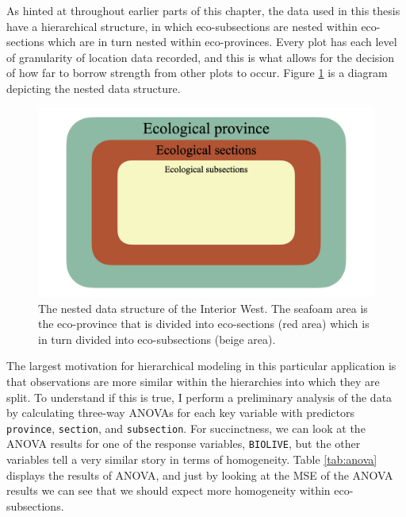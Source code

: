 \documentclass[12pt,twoside]{reedthesis}
\begin{document}
As hinted at throughout earlier parts of this chapter, the data used in this thesis have a hierarchical structure, in which eco-subsections are nested within eco-sections which are in turn nested within eco-provinces. Every plot has each level of granularity of location data recorded, and this is what allows for the decision of how far to borrow strength from other plots to occur. Figure \ref{fig:data-structure} is a diagram depicting the nested data structure.
\begin{figure}

{\centering \includegraphics[width=1\linewidth]{figure/data-structure-new} 

}

\caption[The nested data structure of the Interior West]{The nested data structure of the Interior West. The seafoam area is the eco-province that is divided into eco-sections (red area) which is in turn divided into eco-subsections (beige area).}\label{fig:data-structure}
\end{figure}
The largest motivation for hierarchical modeling in this particular application is that observations are more similar within the hierarchies into which they are split. To understand if this is true, I perform a preliminary analysis of the data by calculating three-way ANOVAs for each key variable with predictors \texttt{province}, \texttt{section}, and \texttt{subsection}. For succinctness, we can look at the ANOVA results for one of the response variables, \texttt{BIOLIVE}, but the other variables tell a very similar story in terms of homogeneity. Table \ref{tab:anova} displays the results of ANOVA, and just by looking at the MSE of the ANOVA results we can see that we should expect more homogeneity within eco-subsections.
\end{document}
